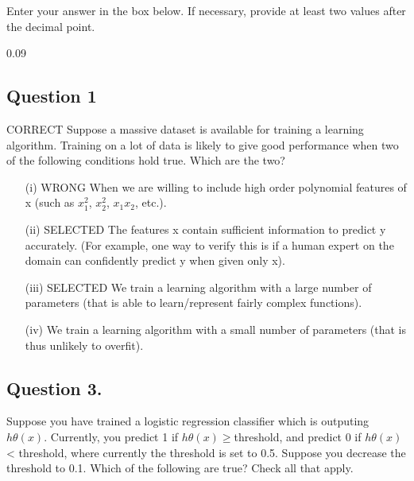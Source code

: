 \documentclass[11pt]{article} %
\begin{document}
Enter your answer in the box below. If necessary, provide at least two values after the decimal point.

0.09
\subsection{Question 1} 
CORRECT
Suppose a massive dataset is available for training a learning algorithm. Training on a lot of data is likely to give good performance when two of the following conditions hold true. Which are the two?

\begin{itemize}
	\item[(i)] WRONG When we are willing to include high order polynomial features of x (such as $x^2_1$, $x^2_2$, $x_1x_2$, etc.).
	
\item[(ii)]	SELECTED The features x contain sufficient information to predict y accurately. (For example, one way to verify this is if a human expert on the domain can confidently predict y when given only x).
	
	
\item[(iii)] 	SELECTED  We train a learning algorithm with a 	large number of parameters (that is able to learn/represent fairly complex functions).
	
	
	
\item[(iv)] 	We train a learning algorithm with a small number of parameters (that is thus unlikely to overfit).
\end{itemize}



\subsection{Question 3.}

Suppose you have trained a logistic regression classifier which is outputing $h\theta(x)$. Currently, you predict 1 if $h\theta(x) \geq $threshold, and predict 0 if $h\theta(x)$ < threshold, where currently the threshold is set to 0.5. Suppose you decrease the threshold to 0.1. Which of the following are true? Check all that apply.
\end{document}
